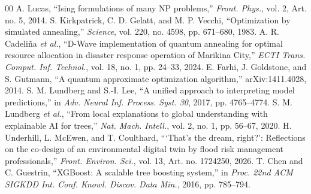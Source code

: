 \documentclass[conference]{IEEEtran}
\begin{document}
\begin{thebibliography}{00}
 A. Lucas, ``Ising formulations of many NP problems,'' \textit{Front. Phys.}, vol. 2, Art. no. 5, 2014.
 S. Kirkpatrick, C. D. Gelatt, and M. P. Vecchi, ``Optimization by simulated annealing,'' \textit{Science}, vol. 220, no. 4598, pp. 671--680, 1983.
 A. R. Cadeli\~{n}a \textit{et al.}, ``D-Wave implementation of quantum annealing for optimal resource allocation in disaster response operation of Marikina City,'' \textit{ECTI Trans. Comput. Inf. Technol.}, vol. 18, no. 1, pp. 24--33, 2024.
 E. Farhi, J. Goldstone, and S. Gutmann, ``A quantum approximate optimization algorithm,'' arXiv:1411.4028, 2014.
 S. M. Lundberg and S.-I. Lee, ``A unified approach to interpreting model predictions,'' in \textit{Adv. Neural Inf. Process. Syst. 30}, 2017, pp. 4765--4774.
 S. M. Lundberg \textit{et al.}, ``From local explanations to global understanding with explainable AI for trees,'' \textit{Nat. Mach. Intell.}, vol. 2, no. 1, pp. 56--67, 2020.
 H. Underhill, L. McEwen, and T. Coulthard, ```That's the dream, right?': Reflections on the co-design of an environmental digital twin by flood risk management professionals,'' \textit{Front. Environ. Sci.}, vol. 13, Art. no. 1724250, 2026.
 T. Chen and C. Guestrin, ``XGBoost: A scalable tree boosting system,'' in \textit{Proc. 22nd ACM SIGKDD Int. Conf. Knowl. Discov. Data Min.}, 2016, pp. 785--794.
\end{thebibliography}
\end{document}

